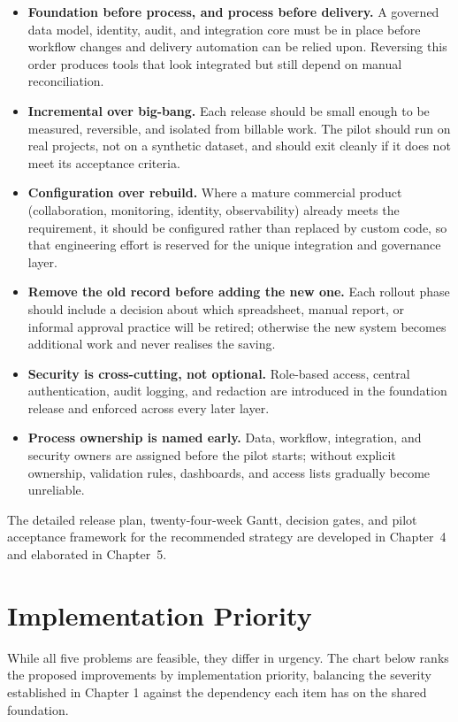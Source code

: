 \documentclass[12pt,a4paper]{report}
\begin{document}
\begin{itemize}[leftmargin=2em]
    \item \textbf{Foundation before process, and process before delivery.} A governed data model, identity, audit, and integration core must be in place before workflow changes and delivery automation can be relied upon. Reversing this order produces tools that look integrated but still depend on manual reconciliation.
    \item \textbf{Incremental over big-bang.} Each release should be small enough to be measured, reversible, and isolated from billable work. The pilot should run on real projects, not on a synthetic dataset, and should exit cleanly if it does not meet its acceptance criteria.
    \item \textbf{Configuration over rebuild.} Where a mature commercial product (collaboration, monitoring, identity, observability) already meets the requirement, it should be configured rather than replaced by custom code, so that engineering effort is reserved for the unique integration and governance layer.
    \item \textbf{Remove the old record before adding the new one.} Each rollout phase should include a decision about which spreadsheet, manual report, or informal approval practice will be retired; otherwise the new system becomes additional work and never realises the saving.
    \item \textbf{Security is cross-cutting, not optional.} Role-based access, central authentication, audit logging, and redaction are introduced in the foundation release and enforced across every later layer.
    \item \textbf{Process ownership is named early.} Data, workflow, integration, and security owners are assigned before the pilot starts; without explicit ownership, validation rules, dashboards, and access lists gradually become unreliable.
\end{itemize}

\noindent The detailed release plan, twenty-four-week Gantt, decision gates, and pilot acceptance framework for the recommended strategy are developed in Chapter~4 and elaborated in Chapter~5.

\section{Implementation Priority}
While all five problems are feasible, they differ in urgency. The chart below ranks the proposed improvements by implementation priority, balancing the severity established in Chapter 1 against the dependency each item has on the shared foundation.
\end{document}
